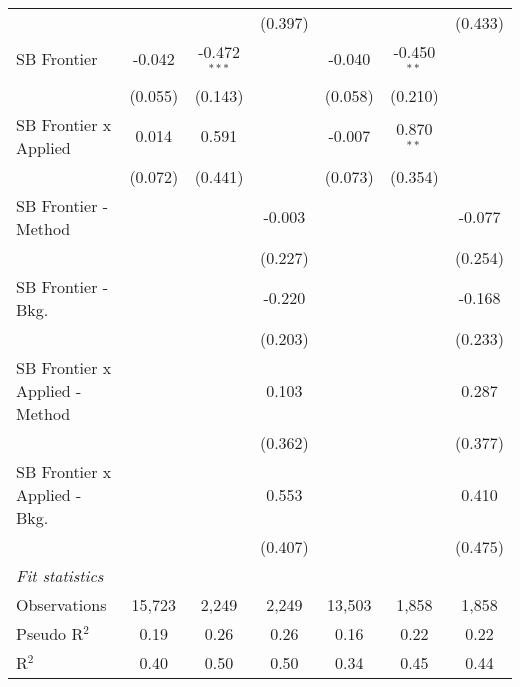 \begin{tabular}{lcccccc}
                                  &         &                & (0.397) &              &               & (0.433)\\   
   SB Frontier                    & -0.042  & -0.472$^{***}$ &         & -0.040       & -0.450$^{**}$ &   \\   
                                  & (0.055) & (0.143)        &         & (0.058)      & (0.210)       &   \\   
   SB Frontier x Applied          & 0.014   & 0.591          &         & -0.007       & 0.870$^{**}$  &   \\   
                                  & (0.072) & (0.441)        &         & (0.073)      & (0.354)       &   \\   
   SB Frontier - Method           &         &                & -0.003  &              &               & -0.077\\   
                                  &         &                & (0.227) &              &               & (0.254)\\   
   SB Frontier - Bkg.             &         &                & -0.220  &              &               & -0.168\\   
                                  &         &                & (0.203) &              &               & (0.233)\\   
   SB Frontier x Applied - Method &         &                & 0.103   &              &               & 0.287\\   
                                  &         &                & (0.362) &              &               & (0.377)\\   
   SB Frontier x Applied - Bkg.   &         &                & 0.553   &              &               & 0.410\\   
                                  &         &                & (0.407) &              &               & (0.475)\\   
   \midrule
   \emph{Fit statistics}\\
   Observations                   & 15,723  & 2,249          & 2,249   & 13,503       & 1,858         & 1,858\\  
   Pseudo R$^2$                   & 0.19    & 0.26           & 0.26    & 0.16         & 0.22          & 0.22\\  
   R$^2$                          & 0.40    & 0.50           & 0.50    & 0.34         & 0.45          & 0.44\\  
   

\end{tabular}
